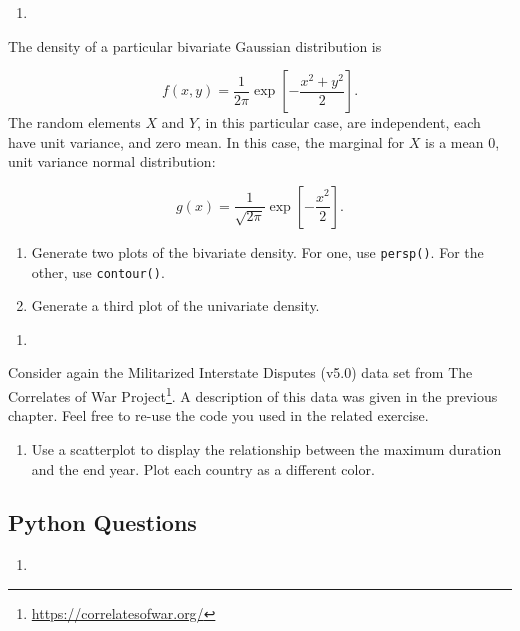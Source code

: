\documentclass[12pt,krantz2]{krantz}
\providecommand{\tightlist}{%
  \setlength{\itemsep}{0pt}\setlength{\parskip}{0pt}}
\renewcommand{\href}[2]{#2\footnote{\url{#1}}}
\begin{document}
\begin{enumerate}
\def\labelenumi{\arabic{enumi}.}
\item
\end{enumerate}

The density of a particular bivariate Gaussian distribution is

\[
f(x,y) = \frac{1}{2 \pi}  \exp\left[ -\frac{x ^2 + y^2}{2}     \right] \tag{1}.
\]
The random elements \(X\) and \(Y\), in this particular case, are independent, each have unit variance, and zero mean. In this case, the marginal for \(X\) is a mean \(0\), unit variance normal distribution:

\[
g(x) = \frac{1}{\sqrt{2\pi}} \exp\left[ -\frac{x ^2 }{2}     \right] \tag{2}.
\]

\begin{enumerate}
\def\labelenumi{\alph{enumi})}
\tightlist
\item
  Generate two plots of the bivariate density. For one, use \texttt{persp()}. For the other, use \texttt{contour()}.
\item
  Generate a third plot of the univariate density.
\end{enumerate}

\begin{enumerate}
\def\labelenumi{\arabic{enumi}.}
\setcounter{enumi}{1}
\item
\end{enumerate}

Consider again the Militarized Interstate Disputes (v5.0) \citep{mid5} data set from \href{https://correlatesofwar.org/}{The Correlates of War Project}. A description of this data was given in the previous chapter. Feel free to re-use the code you used in the related exercise.

\begin{enumerate}
\def\labelenumi{\alph{enumi})}
\tightlist
\item
  Use a scatterplot to display the relationship between the maximum duration and the end year. Plot each country as a different color.
\end{enumerate}

\hypertarget{python-questions-10}{%
\subsection{Python Questions}\label{python-questions-10}}

\begin{enumerate}
\def\labelenumi{\arabic{enumi}.}
\item
\end{enumerate}
\end{document}
